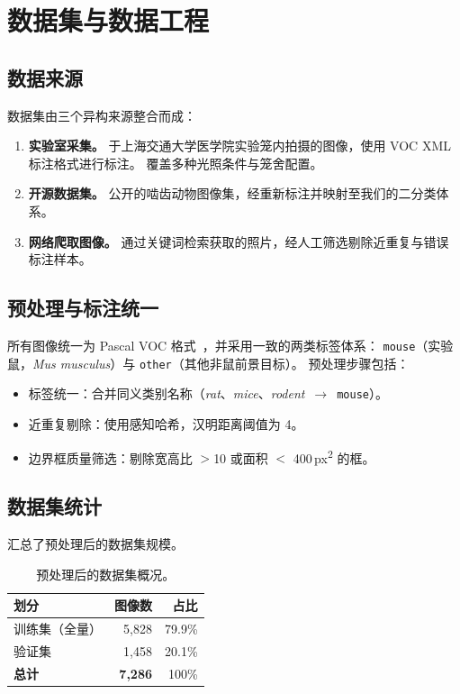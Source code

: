 \section{数据集与数据工程}
\label{sec:dataset}

\subsection{数据来源}

数据集由三个异构来源整合而成：

\begin{enumerate}[leftmargin=1.5em]
  \item \textbf{实验室采集。}
    于上海交通大学医学院实验笼内拍摄的图像，使用 VOC XML 标注格式进行标注。
    覆盖多种光照条件与笼舍配置。

  \item \textbf{开源数据集。}
    公开的啮齿动物图像集，经重新标注并映射至我们的二分类体系。

  \item \textbf{网络爬取图像。}
    通过关键词检索获取的照片，经人工筛选剔除近重复与错误标注样本。
\end{enumerate}

\subsection{预处理与标注统一}

所有图像统一为 Pascal VOC 格式~\citep{everingham2010pascal}，并采用一致的两类标签体系：
\texttt{mouse}（实验鼠，\textit{Mus musculus}）与 \texttt{other}（其他非鼠前景目标）。
预处理步骤包括：

\begin{itemize}[leftmargin=1.5em]
  \item 标签统一：合并同义类别名称（\textit{rat}、\textit{mice}、\textit{rodent}~$\to$~\texttt{mouse}）。
  \item 近重复剔除：使用感知哈希，汉明距离阈值为 4。
  \item 边界框质量筛选：剔除宽高比 $>$10 或面积 $<$ 400\,px\textsuperscript{2} 的框。
\end{itemize}

\subsection{数据集统计}

 汇总了预处理后的数据集规模。

\begin{table}[H]
\centering
\caption{预处理后的数据集概况。}
\label{tab:dataset}
\begin{tabular}{lrr}
\toprule
\textbf{划分} & \textbf{图像数} & \textbf{占比} \\
\midrule
训练集（全量） & 5{,}828 & 79.9\% \\
验证集       & 1{,}458 & 20.1\% \\
\midrule
\textbf{总计}  & \textbf{7{,}286} & 100\% \\
\bottomrule
\end{tabular}
\end{table}

